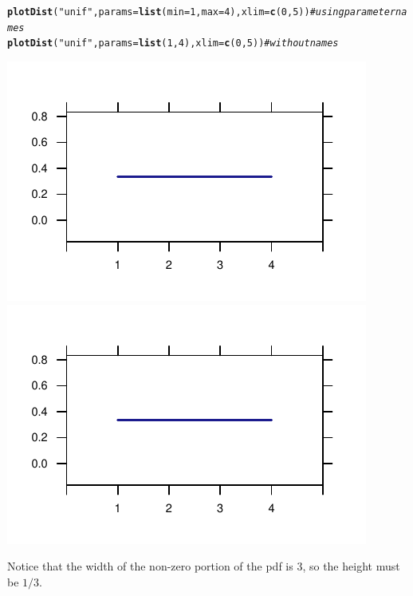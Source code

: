 \documentclass[twoside]{book}\usepackage[]{graphicx}\usepackage[]{xcolor}
\makeatletter
\def\maxwidth{ %
  \ifdim\Gin@nat@width>\linewidth
    \linewidth
  \else
    \Gin@nat@width
  \fi
}
\newcommand{\hlnum}[1]{\textcolor[rgb]{0.686,0.059,0.569}{#1}}%
\newcommand{\hlstr}[1]{\textcolor[rgb]{0.192,0.494,0.8}{#1}}%
\newcommand{\hlcom}[1]{\textcolor[rgb]{0.678,0.584,0.686}{\textit{#1}}}%
\newcommand{\hlstd}[1]{\textcolor[rgb]{0.345,0.345,0.345}{#1}}%
\newcommand{\hlkwc}[1]{\textcolor[rgb]{0.333,0.667,0.333}{#1}}%
\newcommand{\hlkwd}[1]{\textcolor[rgb]{0.737,0.353,0.396}{\textbf{#1}}}%
\newenvironment{kframe}{%
 \def\at@end@of@kframe{}%
 \ifinner\ifhmode%
  \def\at@end@of@kframe{\end{minipage}}%
  \begin{minipage}{\columnwidth}%
 \fi\fi%
 \def\FrameCommand##1{\hskip\@totalleftmargin \hskip-\fboxsep
 \colorbox{shadecolor}{##1}\hskip-\fboxsep
     \hskip-\linewidth \hskip-\@totalleftmargin \hskip\columnwidth}%
 \MakeFramed {\advance\hsize-\width
   \@totalleftmargin\z@ \linewidth\hsize
   \@setminipage}}%
 {\par\unskip\endMakeFramed%
 \at@end@of@kframe}
\newenvironment{knitrout}{}{} %
\makeatother
\begin{document}
\begin{knitrout}
\color{fgcolor}\begin{kframe}
\begin{alltt}
\hlkwd{plotDist}\hlstd{(}\hlstr{"unif"}\hlstd{,} \hlkwc{params} \hlstd{=} \hlkwd{list}\hlstd{(}\hlkwc{min} \hlstd{=} \hlnum{1}\hlstd{,} \hlkwc{max} \hlstd{=} \hlnum{4}\hlstd{),} \hlkwc{xlim} \hlstd{=} \hlkwd{c}\hlstd{(}\hlnum{0}\hlstd{,} \hlnum{5}\hlstd{))}  \hlcom{# using parameter names}
\hlkwd{plotDist}\hlstd{(}\hlstr{"unif"}\hlstd{,} \hlkwc{params} \hlstd{=} \hlkwd{list}\hlstd{(}\hlnum{1}\hlstd{,} \hlnum{4}\hlstd{),} \hlkwc{xlim} \hlstd{=} \hlkwd{c}\hlstd{(}\hlnum{0}\hlstd{,} \hlnum{5}\hlstd{))}  \hlcom{# without names}
\end{alltt}
\end{kframe}

{\centering \includegraphics[width=\maxwidth]{figures/fig-unnamed-chunk-75-1} 
\includegraphics[width=\maxwidth]{figures/fig-unnamed-chunk-75-2} 

}



\end{knitrout}
Notice that the width of the non-zero portion of the pdf is 3, so the height must be $1/3$.
\end{document}
